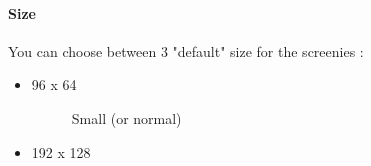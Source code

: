 \documentclass[10pt]{report}
\begin{document}
\paragraph{Size}

You can choose between 3 "default" size for the screenies :\newline
\begin{itemize}
\item 96 x 64
\begin{figure}[H]
\centering
{}
\caption{Small (or normal)}
\end{figure}
\item 192 x 128
\begin{figure}[H]
\centering
{}

\end{figure}
\end{itemize}
\end{document}
